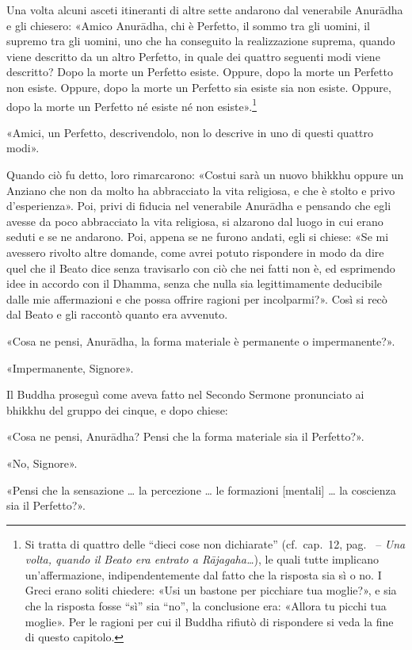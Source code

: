 Una volta alcuni asceti itineranti di altre sette andarono dal venerabile
Anurādha e gli chiesero: «Amico Anurādha, chi è Perfetto, il sommo tra gli
uomini, il supremo tra gli uomini, uno che ha conseguito la realizzazione
suprema, quando viene descritto da un altro Perfetto, in quale dei quattro
seguenti modi viene descritto? Dopo la morte un Perfetto esiste. Oppure, dopo la
morte un Perfetto non esiste. Oppure, dopo la morte un Perfetto sia esiste sia
non esiste. Oppure, dopo la morte un Perfetto né esiste né non
esiste».\footnote{%
  Si tratta di quattro delle “dieci cose non dichiarate” (cf.~cap.~12,
  pag.~\pageref{pag230} -- \emph{Una volta, quando il Beato era entrato a
    Rājagaha\ldots}), le quali tutte implicano un’affermazione,
  indipendentemente dal fatto che la risposta sia sì o no. I Greci erano soliti
  chiedere: «Usi un bastone per picchiare tua moglie?», e sia che la risposta
  fosse “sì” sia “no”, la conclusione era: «Allora tu picchi tua moglie». Per le
  ragioni per cui il Buddha rifiutò di rispondere si veda la fine di questo
  capitolo.}

«Amici, un Perfetto, descrivendolo, non lo descrive in uno di questi quattro
modi».

Quando ciò fu detto, loro rimarcarono: «Costui sarà un nuovo bhikkhu oppure un
Anziano che non da molto ha abbracciato la vita religiosa, e che è stolto e
privo d’esperienza». Poi, privi di fiducia nel venerabile Anurādha e pensando
che egli avesse da poco abbracciato la vita religiosa, si alzarono dal luogo in
cui erano seduti e se ne andarono. Poi, appena se ne furono andati, egli si
chiese: «Se mi avessero rivolto altre domande, come avrei potuto rispondere in
modo da dire quel che il Beato dice senza travisarlo con ciò che nei fatti non
è, ed esprimendo idee in accordo con il Dhamma, senza che nulla sia
legittimamente deducibile dalle mie affermazioni e che possa offrire ragioni per
incolparmi?». Così si recò dal Beato e gli raccontò quanto era avvenuto.

«Cosa ne pensi, Anurādha, la forma materiale è permanente o impermanente?».

«Impermanente, Signore».

 Il Buddha proseguì come aveva fatto nel Secondo
Sermone pronunciato ai bhikkhu del gruppo dei cinque, e dopo chiese:

«Cosa ne pensi, Anurādha? Pensi che la forma materiale sia il Perfetto?».

«No, Signore».

«Pensi che la sensazione … la percezione … le formazioni [mentali] … la
coscienza sia il Perfetto?».

